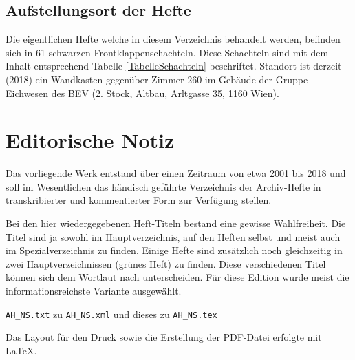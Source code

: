 \documentclass[a4paper]{scrbook}
\begin{document}
\section{Aufstellungsort der Hefte}

Die eigentlichen Hefte welche in diesem Verzeichnis behandelt werden, befinden sich in 61 schwarzen Frontklappenschachteln. Diese Schachteln sind mit dem Inhalt entsprechend Tabelle \ref{TabelleSchachteln}{} beschriftet. Standort ist derzeit (2018) ein Wandkasten gegenüber Zimmer 260  im Gebäude der Gruppe Eichwesen des BEV (2. Stock, Altbau, Arltgasse 35, 1160 Wien).





\chapter{Editorische Notiz}
Das vorliegende Werk entstand über einen Zeitraum von etwa 2001 bis 2018 und soll im Wesentlichen das händisch geführte Verzeichnis der Archiv-Hefte in transkribierter und kommentierter Form zur Verfügung stellen.

Bei den hier wiedergegebenen Heft-Titeln bestand eine gewisse Wahlfreiheit. Die Titel sind ja sowohl im Hauptverzeichnis, auf den Heften selbst und meist auch im Spezialverzeichnis zu finden. Einige Hefte sind zusätzlich noch gleichzeitig in zwei Hauptverzeichnissen (\glqq{}grünes Heft\grqq{}) zu finden. Diese verschiedenen Titel können sich dem Wortlaut nach unterscheiden. Für diese Edition wurde meist die informationsreichste Variante ausgewählt.

\texttt{AH\_NS.txt} zu \texttt{AH\_NS.xml} und dieses zu \texttt{AH\_NS.tex}

Das Layout für den Druck sowie die Erstellung der PDF-Datei erfolgte mit \LaTeX.
\end{document}
